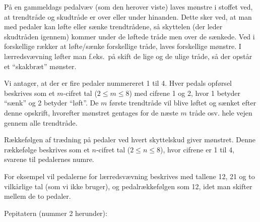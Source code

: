 \documentclass[a4paper,12pt]{article}
\begin{document}
\begin{center}
\end{center}

På en gammeldags pedalvæv (som den herover viste) laves mønstre i
stoffet ved, at trendtråde og skudtråde er over eller under hinanden.
Dette sker ved, at man med pedaler kan løfte eller sænke trendtrådene,
så skyttelen (der leder skudtråden igennem) kommer under de løftede
tråde men over de sænkede.  Ved i forskellige rækker at løfte/sænke
forskellige tråde, laves forskellige mønstre.  I lærredsvævning løfter
man f.eks.\ på skift de lige og de ulige tråde, så der opstår et
``skakbræt'' mønster.

Vi antager, at der er fire pedaler nummereret 1 til 4.  Hver pedals
opførsel beskrives som et $m$-cifret tal ($2\leq m\leq 8$) med cifrene
1 og 2, hvor 1 betyder ``sænk'' og 2 betyder ``løft''.  De $m$ første
trendtråde vil blive løftet og sænket efter denne opskrift, hvorefter
mønstret gentages for de næste $m$ tråde osv. hele vejen gennem alle
trendtråde.

Rækkefølgen af trædning på pedaler ved hvert skyttelskud giver
mønstret. Denne rækkefølge beskrives som et $n$-cifret tal ($2\leq
n\leq 8$), hvor cifrene er 1 til 4, svarene til pedalernes numre.

For eksempel vil pedalerne for lærredsvævning beskrives med tallene
12, 21 og to vilkårlige tal (som vi ikke bruger), og pedalrækkefølgen
som 12, idet man skifter mellem de to pedaler.

Pepitatern (nummer 2 herunder):

\begin{center}
\end{center}
\end{document}
